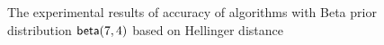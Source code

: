 \begin{figure}
\begin{center}
\centering
\caption{The experimental results of accuracy of algorithms with Beta prior distribution $\mathsf{beta}(7,4)$ based on Hellinger distance}
\label{fig_beta_hellinger}
\end{center}
\end{figure}

